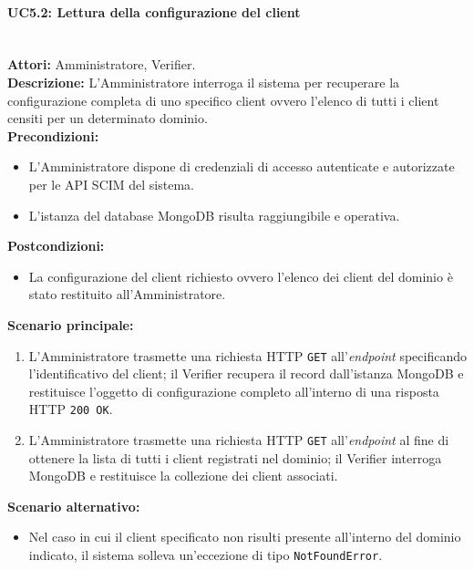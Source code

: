\paragraph{\large\bfseries UC5.2: Lettura della configurazione del client}
\label{uc:verifier:uc5.2}
\mbox{}\\
\noindent\textbf{Attori:} Amministratore, Verifier.
\\
\noindent\textbf{Descrizione:} L'Amministratore interroga il sistema per recuperare la configurazione completa di uno specifico client ovvero l'elenco di tutti i client censiti per un determinato dominio.
\\
\noindent\textbf{Precondizioni:}
\begin{itemize}
    \item L'Amministratore dispone di credenziali di accesso autenticate e autorizzate per le API SCIM del sistema.
    \item L'istanza del database MongoDB risulta raggiungibile e operativa.
\end{itemize}
\noindent\textbf{Postcondizioni:}
\begin{itemize}
    \item La configurazione del client richiesto ovvero l'elenco dei client del dominio è stato restituito all'Amministratore.
\end{itemize}

\noindent\textbf{Scenario principale:}
\begin{enumerate}
    \item L'Amministratore trasmette una richiesta HTTP \texttt{GET} all'\textit{endpoint} specificando l'identificativo del client; il Verifier recupera il record dall'istanza MongoDB e restituisce l'oggetto di configurazione completo all'interno di una risposta HTTP \texttt{200 OK}.
    \item L'Amministratore trasmette una richiesta HTTP \texttt{GET} all'\textit{endpoint} al fine di ottenere la lista di tutti i client registrati nel dominio; il Verifier interroga MongoDB e restituisce la collezione dei client associati.
\end{enumerate}

\noindent\textbf{Scenario alternativo:}
\begin{itemize}
    \item Nel caso in cui il client specificato non risulti presente all'interno del dominio indicato, il sistema solleva un'eccezione di tipo \texttt{NotFoundError}.
\end{itemize}

